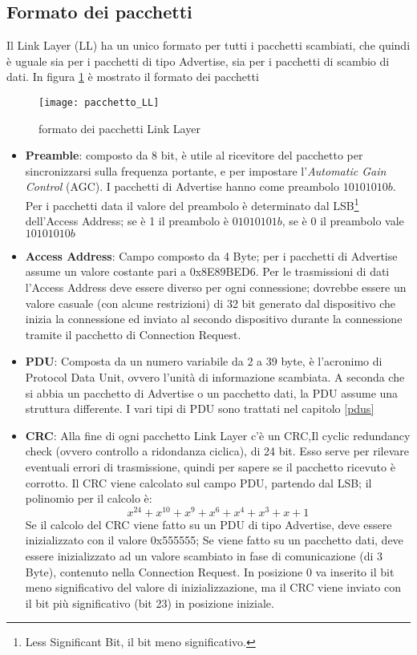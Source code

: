 \subsection{Formato dei pacchetti}

Il Link Layer (LL) ha un unico formato per tutti i pacchetti scambiati, che quindi è uguale sia per i pacchetti di tipo Advertise, sia per i pacchetti di scambio di dati.
In figura \ref{pacchetto_LL} è mostrato il formato dei pacchetti

\begin{figure}[H]
\texttt{[image: pacchetto\_LL]}
\centering
\caption{formato dei pacchetti Link Layer}
\label{pacchetto_LL}
\end{figure}

\begin{itemize}

\item \textbf{Preamble}: composto da 8 bit, è utile al ricevitore del pacchetto per sincronizzarsi sulla frequenza portante, e per impostare l'\emph{Automatic Gain Control} (AGC).
I pacchetti di Advertise hanno come preambolo $10101010b$. Per i pacchetti data il valore del preambolo è determinato dal LSB\footnote{Less Significant Bit, il bit meno significativo.} dell'Access Address; se è 1 il preambolo è $01010101b$, se è 0 il preambolo vale $10101010b$


\item \textbf{Access Address}: \label{access_address}
Campo composto da 4 Byte; per i pacchetti di Advertise assume un valore costante pari a 0x8E89BED6. Per le trasmissioni di dati l'Access Address deve essere diverso per ogni connessione; dovrebbe essere un valore casuale (con alcune restrizioni) di 32 bit generato dal dispositivo che inizia la connessione ed inviato al secondo dispositivo durante la connessione tramite il pacchetto di Connection Request. 

\item \textbf{PDU}:
Composta da un numero variabile da 2 a 39 byte, è l'acronimo di Protocol Data Unit, ovvero l'unità di informazione scambiata. A seconda che si abbia un pacchetto di Advertise o un pacchetto dati, la PDU assume una struttura differente. I vari tipi di PDU sono trattati nel capitolo \ref{pdus}

\item \textbf{CRC}:
Alla fine di ogni pacchetto Link Layer c'è un CRC,Il cyclic redundancy check (ovvero controllo a ridondanza ciclica), di 24 bit. Esso serve per rilevare eventuali errori di trasmissione, quindi per sapere se il pacchetto ricevuto è corrotto.
Il CRC viene calcolato sul campo PDU, partendo dal LSB; il polinomio per il calcolo è:
\[x^24 + x^10 + x^9 + x^6 + x^4 + x^3 + x + 1\] 
Se il calcolo del CRC viene fatto su un PDU di tipo Advertise, deve essere inizializzato con il valore 0x555555;
Se viene fatto su un pacchetto dati, deve essere inizializzato ad un valore scambiato in fase di comunicazione (di 3 Byte), contenuto nella Connection Request.
In posizione 0 va inserito il bit meno significativo del valore di inizializzazione, ma il CRC viene inviato con il bit più significativo (bit 23) in posizione iniziale.

\end{itemize}
